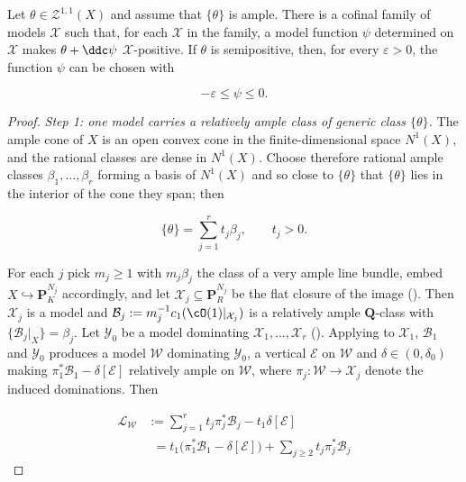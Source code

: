 \begin{proposition}\label{prop:ch20-positive-representative}
Let \(\theta\in\mathcal Z^{1,1}(X)\) and assume that
\(\{\theta\}\) is ample.  There is a cofinal family of models
\(\mathcal X\) such that, for each \(\mathcal X\) in the family, a model
function \(\psi\) determined on \(\mathcal X\) makes
\(\theta+\ddc\psi\) \(\mathcal X\)-positive.  If \(\theta\) is
semipositive, then, for every \(\varepsilon>0\), the function \(\psi\) can
be chosen with

\begin{equation}
\label{eq:ch20-small-positive-representative}
                       -\varepsilon\leq\psi\leq0.
\end{equation}
\end{proposition}

\begin{proof}
\emph{Step 1: one model carries a relatively ample class of generic class
\(\{\theta\}\).}  The ample cone of \(X\) is an open convex cone in the
finite-dimensional space \(N^1(X)\), and the rational classes are dense in
\(N^1(X)\).  Choose therefore rational ample classes
\(\beta_1,\ldots,\beta_r\) forming a basis of \(N^1(X)\) and so close to
\(\{\theta\}\) that \(\{\theta\}\) lies in the interior of the cone they
span; then

\begin{equation}
\label{eq:ch20-ample-decomposition}
 \{\theta\}=\sum_{j=1}^rt_j\beta_j,\qquad t_j>0 .
\end{equation}

For each \(j\) pick \(m_j\geq1\) with \(m_j\beta_j\) the class of a very
ample line bundle, embed \(X\hookrightarrow\mathbf P^{N_j}_K\) accordingly,
and let \(\mathcal X_j\subseteq\mathbf P^{N_j}_R\) be the flat closure of the
image ().  Then \(\mathcal X_j\) is a model and
\(\mathcal B_j:=m_j^{-1}c_1(\cO(1)|_{\mathcal X_j})\) is a relatively ample
\(\mathbf Q\)-class with \(\{\mathcal B_j|_X\}=\beta_j\).  Let
\(\mathcal Y_0\) be a model dominating \(\mathcal X_1,\ldots,\mathcal X_r\)
().  Applying
 to \(\mathcal X_1\), \(\mathcal B_1\) and
\(\mathcal Y_0\) produces a model \(\mathcal W\) dominating
\(\mathcal Y_0\), a vertical \(\mathcal E\) on \(\mathcal W\) and
\(\delta\in(0,\delta_0)\) making
\(\pi_1^*\mathcal B_1-\delta[\mathcal E]\) relatively ample on
\(\mathcal W\), where \(\pi_j:\mathcal W\to\mathcal X_j\) denote the induced
dominations.  Then

\[
\begin{aligned}
 \mathcal L_{\mathcal W}
 &:=\sum_{j=1}^rt_j\pi_j^*\mathcal B_j-t_1\delta[\mathcal E]\\
 &\phantom{:}=t_1\bigl(\pi_1^*\mathcal B_1-\delta[\mathcal E]\bigr)
  +\sum_{j\geq2}t_j\pi_j^*\mathcal B_j
\end{aligned}
\]


\end{proof}
